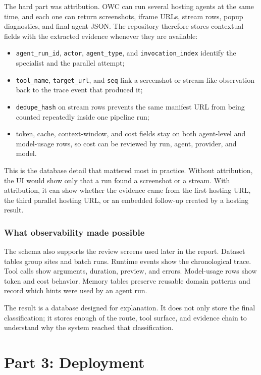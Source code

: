 The hard part was attribution. OWC can run several hosting agents at the same time, and
each one can return screenshots, iframe URLs, stream rows, popup diagnostics, and final
agent JSON. The repository therefore stores contextual fields with the extracted
evidence whenever they are available:
\begin{itemize}
  \item \texttt{agent\_run\_id}, \texttt{actor}, \texttt{agent\_type}, and
  \texttt{invocation\_index} identify the specialist and the parallel attempt;
  \item \texttt{tool\_name}, \texttt{target\_url}, and \texttt{seq} link a screenshot or
  stream-like observation back to the trace event that produced it;
  \item \texttt{dedupe\_hash} on stream rows prevents the same manifest URL from being
  counted repeatedly inside one pipeline run;
  \item token, cache, context-window, and cost fields stay on both agent-level and
  model-usage rows, so cost can be reviewed by run, agent, provider, and model.
\end{itemize}

This is the database detail that mattered most in practice. Without attribution, the UI
would show only that a run found a screenshot or a stream. With attribution, it can show
whether the evidence came from the first hosting URL, the third parallel hosting URL, or
an embedded follow-up created by a hosting result.

\subsubsection{What observability made possible}

The schema also supports the review screens used later in the report. Dataset tables
group sites and batch runs. Runtime events show the chronological trace. Tool calls show
arguments, duration, preview, and errors. Model-usage rows show token and cost behavior.
Memory tables preserve reusable domain patterns and record which hints were used by an
agent run.

The result is a database designed for explanation. It does not only store the final
classification; it stores enough of the route, tool surface, and evidence chain to
understand why the system reached that classification.

\section{Part 3: Deployment}

